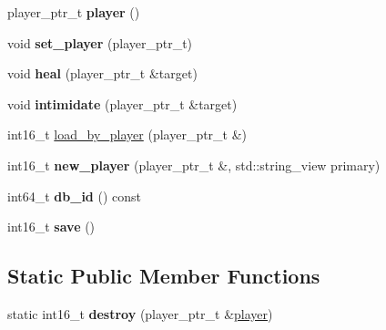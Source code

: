 \begin{DoxyCompactItemize}
\item 
\mbox{\label{structmods_1_1classes_1_1sentinel_abc276a79b8116c1a9d515fbe3594ee2b}} 
player\+\_\+ptr\+\_\+t {\bfseries player} ()
\item 
\mbox{\label{structmods_1_1classes_1_1sentinel_a01eb7deeb4783b840e11e7680eec19e5}} 
void {\bfseries set\+\_\+player} (player\+\_\+ptr\+\_\+t)
\item 
\mbox{\label{structmods_1_1classes_1_1sentinel_a9ba46bef72a3f004dcdea0069c3d895a}} 
void {\bfseries heal} (player\+\_\+ptr\+\_\+t \&target)
\item 
\mbox{\label{structmods_1_1classes_1_1sentinel_ac45bdc4f3a5a37b7cb5a7b7745b75658}} 
void {\bfseries intimidate} (player\+\_\+ptr\+\_\+t \&target)
\item 
int16\+\_\+t \hyperlink{structmods_1_1classes_1_1sentinel_a5065711e4b84a36b6c14d7c878322562}{load\+\_\+by\+\_\+player} (player\+\_\+ptr\+\_\+t \&)
\item 
\mbox{\label{structmods_1_1classes_1_1sentinel_a7523ab8596796006a3abb3d5277603d3}} 
int16\+\_\+t {\bfseries new\+\_\+player} (player\+\_\+ptr\+\_\+t \&, std\+::string\+\_\+view primary)
\item 
\mbox{\label{structmods_1_1classes_1_1sentinel_a7d1d4ef7b4231a6411e6d592adca2289}} 
int64\+\_\+t {\bfseries db\+\_\+id} () const
\item 
\mbox{\label{structmods_1_1classes_1_1sentinel_a9dcecbca9a024afca5ed9ac2dfcef0e8}} 
int16\+\_\+t {\bfseries save} ()
\end{DoxyCompactItemize}
\subsection*{Static Public Member Functions}
\begin{DoxyCompactItemize}
\item 
\mbox{\label{structmods_1_1classes_1_1sentinel_a05f04bf4f5744bddf64492fdd55df415}} 
static int16\+\_\+t {\bfseries destroy} (player\+\_\+ptr\+\_\+t \&\hyperlink{classmods_1_1player}{player})
\end{DoxyCompactItemize}
